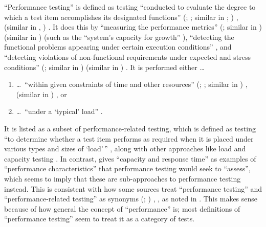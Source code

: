 ``Performance testing'' is defined as testing ``conducted to evaluate the
degree to which a test item accomplishes its designated functions''
\ifnotpaper
      (\citealp[p.~7]{IEEE2022}; \citeyear[p.~320]{IEEE2017}; similar in
      \citeyear[pp.~38-39]{IEEE2021}; \citealp[p.~1187]{Moghadam2019})%
\else
      \cite[p.~320]{IEEE2017}, \cite[p.~7]{IEEE2022} (similar in
      \cite[pp.~38-39]{IEEE2021}, \cite[p.~1187]{Moghadam2019})%
\fi. It does this
by ``measuring the performance metrics''
\ifnotpaper
      (\citealp[p.~1187]{Moghadam2019}; similar in \citealpISTQB{})
\else
      \cite[p.~1187]{Moghadam2019} (similar in \cite{ISTQB})
\fi (such as the ``system's capacity for growth''
\citep[p.~23]{Gerrard2000b}), ``detecting the functional problems appearing
under certain execution conditions'' \citep[p.~1187]{Moghadam2019}, and
``detecting violations of non-functional requirements under expected and
stress conditions'' \ifnotpaper
      (\citealp[p.~1187]{Moghadam2019}; similar in \citep[p.~5-9]{SWEBOK2024})%
\else
      \cite[p.~1187]{Moghadam2019} (similar in \cite[p.~5-9]{SWEBOK2024})%
\fi. It is performed either \dots\
\begin{enumerate}
      \item \dots\ ``within given constraints of time and other resources''
            \ifnotpaper
                  (\citealp[p.~7]{IEEE2022}; \citeyear[p.~320]{IEEE2017};
                  similar in \citealp[p.~1187]{Moghadam2019})%
            \else
                  \cite[p.~320]{IEEE2017}, \cite[p.~7]{IEEE2022} (similar
                  in \cite[p.~1187]{Moghadam2019})%
            \fi, or
      \item \dots\ ``under a `typical' load'' \citep[p.~39]{IEEE2021}.
\end{enumerate}

It is listed as a subset of performance-related testing, which is defined as
testing ``to determine whether a test item performs as required when it is
placed under various types and sizes of `load'\,'' \citeyearpar[p.~38]{IEEE2021},
along with other approaches like load and capacity testing
\citep[p.~22]{IEEE2022}. In contrast, \citet[p.~5-9]{SWEBOK2024}
gives ``capacity and response time'' as examples of ``performance
characteristics'' that performance testing would seek to ``assess'', which
seems to imply that these are sub-approaches to performance testing instead.
This is consistent with how some sources treat ``performance testing'' and
``performance-related testing'' as synonyms \ifnotpaper
      (\citealp[p.~5-9]{SWEBOK2024}; \citealp[p.~1187]{Moghadam2019})%
\else \cite[p.~5-9]{SWEBOK2024}, \cite[p.~1187]{Moghadam2019}%
\fi, as noted in . This makes sense because of how general the
concept of ``performance'' is; most definitions of ``performance testing'' seem
to treat it as a category of tests.

